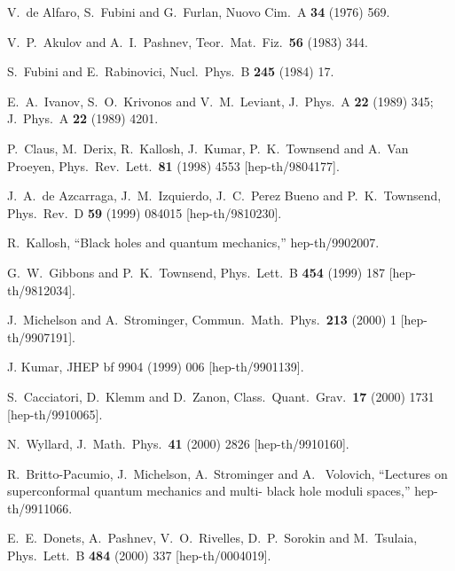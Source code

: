\documentclass[a4paper,12pt]{article}
\begin{document}
\begin{thebibliography}{99}

V.~de Alfaro, S.~Fubini and G.~Furlan,
Nuovo Cim.\ A {\bf 34} (1976) 569.

V.~P.~Akulov and A.~I.~Pashnev,
Teor.\ Mat.\ Fiz.\  {\bf 56} (1983) 344.

S.~Fubini and E.~Rabinovici,
Nucl.\ Phys.\ B {\bf 245} (1984) 17.

E.~A.~Ivanov, S.~O.~Krivonos and V.~M.~Leviant,
J.\ Phys.\ A {\bf 22} (1989) 345;
J.\ Phys.\ A {\bf 22} (1989) 4201.

P.~Claus, M.~Derix, R.~Kallosh, J.~Kumar, P.~K.~Townsend and
A.~Van Proeyen,
Phys.\ Rev.\ Lett.\  {\bf 81} (1998) 4553
[hep-th/9804177].


J.~A.~de Azcarraga, J.~M.~Izquierdo, J.~C.~Perez Bueno and
P.~K.~Townsend,
Phys.\ Rev.\ D {\bf 59} (1999) 084015
[hep-th/9810230].


R.~Kallosh,
``Black holes and quantum mechanics,''
hep-th/9902007.


G.~W.~Gibbons and P.~K.~Townsend,
Phys.\ Lett.\ B {\bf 454} (1999) 187
[hep-th/9812034].


J.~Michelson and A.~Strominger,
Commun.\ Math.\ Phys.\  {\bf 213} (2000) 1
[hep-th/9907191].


J. Kumar,
JHEP {bf 9904} (1999)  006
[hep-th/9901139].


S.~Cacciatori, D.~Klemm and D.~Zanon,
Class.\ Quant.\ Grav.\  {\bf 17} (2000) 1731
[hep-th/9910065].

N.~Wyllard,
J.\ Math.\ Phys.\  {\bf 41} (2000) 2826
[hep-th/9910160].


R.~Britto-Pacumio, J.~Michelson, A.~Strominger and A.~
Volovich,
``Lectures on superconformal quantum mechanics and multi-
black hole  moduli spaces,''
hep-th/9911066.


E.~E.~Donets, A.~Pashnev, V.~O.~Rivelles, D.~P.~Sorokin and
M.~Tsulaia,
Phys.\ Lett.\ B {\bf 484} (2000) 337
[hep-th/0004019].



\end{thebibliography}
\end{document}
